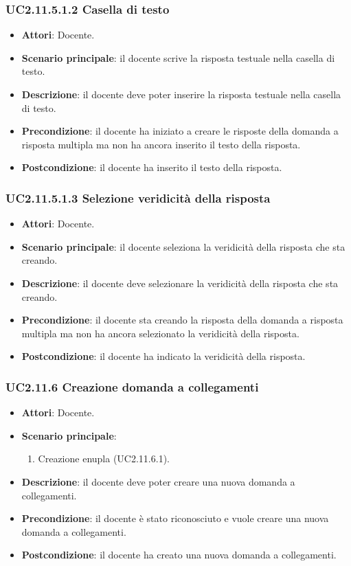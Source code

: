 \subsubsection{UC2.11.5.1.2 Casella di testo}
\begin{itemize}
\item \textbf{Attori}: Docente.
\item \textbf{Scenario principale}: il docente scrive la risposta testuale nella casella di testo.
\item \textbf{Descrizione}: il docente deve poter inserire la risposta testuale nella casella di testo.
\item \textbf{Precondizione}: il docente ha iniziato a creare le risposte della domanda a risposta multipla ma non ha ancora inserito il testo della risposta.
\item \textbf{Postcondizione}: il docente ha inserito il testo della risposta.
\end{itemize}
\subsubsection{UC2.11.5.1.3 Selezione veridicità della risposta}
\begin{itemize}
\item \textbf{Attori}: Docente.
\item \textbf{Scenario principale}: il docente seleziona la veridicità della risposta che sta creando.
\item \textbf{Descrizione}: il docente deve selezionare la veridicità della risposta che sta creando.
\item \textbf{Precondizione}: il docente sta creando la risposta della domanda a risposta multipla ma non ha ancora selezionato la veridicità della risposta.
\item \textbf{Postcondizione}: il docente ha indicato la veridicità della risposta.
\end{itemize}
\subsubsection{UC2.11.6 Creazione domanda a collegamenti}
\begin{itemize}
\item \textbf{Attori}: Docente.
\item \textbf{Scenario principale}:
\begin{enumerate}
\item Creazione enupla (UC2.11.6.1).
\end{enumerate}
\item \textbf{Descrizione}: il docente deve poter creare una nuova domanda a collegamenti.
\item \textbf{Precondizione}: il docente è stato riconosciuto e vuole creare una nuova domanda a collegamenti.
\item \textbf{Postcondizione}: il docente ha creato una nuova domanda a collegamenti.
\end{itemize}
